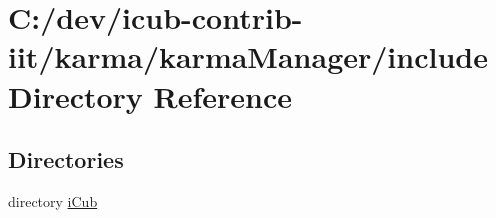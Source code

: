 \section{C\+:/dev/icub-\/contrib-\/iit/karma/karma\+Manager/include Directory Reference}
\label{dir_5d568975207dc5f2048f2878312d2b85}
\subsection*{Directories}
\begin{DoxyCompactItemize}
\item 
directory \hyperlink{dir_bb4e408f99a50b7aa026cb103234dde2}{i\+Cub}
\end{DoxyCompactItemize}
